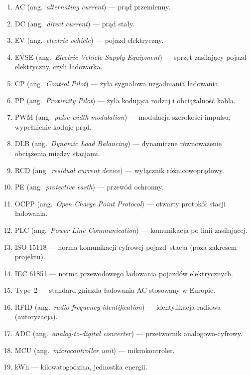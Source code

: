 \documentclass[11pt]{article}
\begin{document}
\begin{enumerate}
  \item AC (ang.\ \textit{alternating current}) --- prąd przemienny.
  \item DC (ang.\ \textit{direct current}) --- prąd stały.
  \item EV (ang.\ \textit{electric vehicle}) --- pojazd elektryczny.
  \item EVSE (ang.\ \textit{Electric Vehicle Supply Equipment}) --- sprzęt zasilający pojazd elektryczny, czyli ładowarka.
  \item CP (ang.\ \textit{Control Pilot}) --- żyła sygnałowa uzgadniania ładowania.
  \item PP (ang.\ \textit{Proximity Pilot}) --- żyła kodująca rodzaj i obciążalność kabla.
  \item PWM (ang.\ \textit{pulse-width modulation}) --- modulacja szerokości impulsu; wypełnienie koduje prąd.
  \item DLB (ang.\ \textit{Dynamic Load Balancing}) --- dynamiczne równoważenie obciążenia między stacjami.
  \item RCD (ang.\ \textit{residual current device}) --- wyłącznik różnicowoprądowy.
  \item PE (ang.\ \textit{protective earth}) --- przewód ochronny.
  \item OCPP (ang.\ \textit{Open Charge Point Protocol}) --- otwarty protokół stacji ładowania.
  \item PLC (ang.\ \textit{Power Line Communication}) --- komunikacja po linii zasilającej.
  \item ISO 15118 --- norma komunikacji cyfrowej pojazd--stacja (poza zakresem projektu).
  \item IEC 61851 --- norma przewodowego ładowania pojazdów elektrycznych.
  \item Type~2 --- standard gniazda ładowania AC stosowany w Europie.
  \item RFID (ang.\ \textit{radio-frequency identification}) --- identyfikacja radiowa (autoryzacja).
  \item ADC (ang.\ \textit{analog-to-digital converter}) --- przetwornik analogowo-cyfrowy.
  \item MCU (ang.\ \textit{microcontroller unit}) --- mikrokontroler.
  \item kWh --- kilowatogodzina, jednostka energii.
\end{enumerate}
\end{document}
